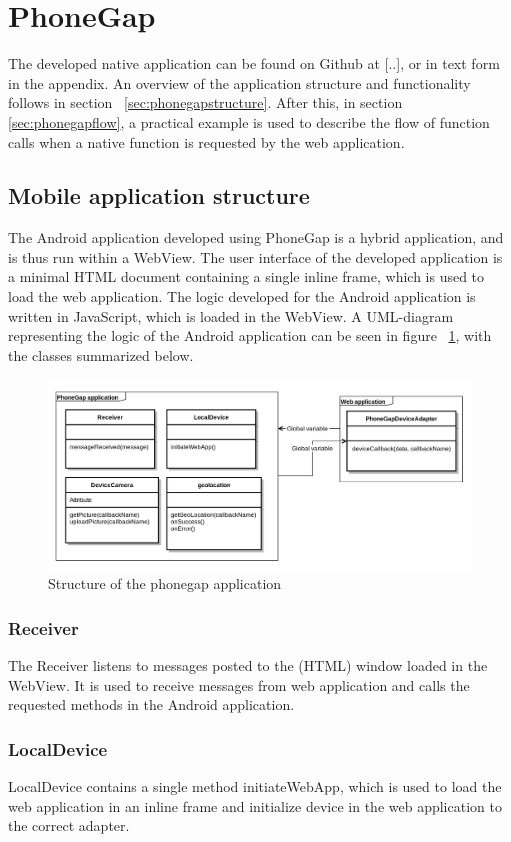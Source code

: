 \section{PhoneGap}\label{sec:phonegap}
The developed native application can be found on Github at [..], or in text form in the appendix. An overview of the application structure and functionality follows in section ~\ref{sec:phonegapstructure}. After this, in section \ref{sec:phonegapflow}, a practical example is used to describe the flow of function calls when a native function is requested by the web application.
\subsection{Mobile application structure} \label{subsec:application-structure-phonegap}
The Android application developed using PhoneGap is a hybrid application, and is thus run within a WebView. The user interface of the developed application is a minimal HTML document containing a single inline frame, which is used to load the web application. The logic developed for the Android application is written in JavaScript, which is loaded in the WebView. A UML-diagram representing the logic of the Android application can be seen in figure ~\ref{fig:phonegapuml},  with the classes summarized below.
\begin{figure}[h!]
	\centering
    \includegraphics[width=120mm,natwidth=800,natheight=600]{./img/phonegapuml.png}
    \caption{Structure of the phonegap application}
    \label{fig:phonegapuml}
\end{figure}

\subsubsection{Receiver}
The Receiver listens to messages posted to the (HTML) window loaded in the WebView. It is used to receive messages from web application and calls the requested methods in the Android application.
\subsubsection{LocalDevice}
LocalDevice contains a single method initiateWebApp, which is used to load the web application in an inline frame and initialize device in the web application to the correct adapter.
